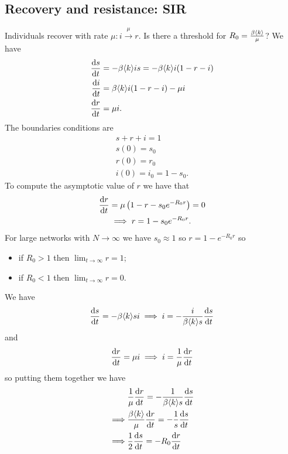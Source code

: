 \documentclass[a4paper,9pt]{extarticle}
\begin{document}
\begin{multicols*}{2}
	\subsection{Recovery and resistance: SIR}
	Individuals recover with rate $\mu:i\xrightarrow{\mu}r$. Is there a threshold for $R_{0}=\frac{\beta\langle k \rangle}{\mu}$? We have
	\begin{align*}
		\frac{\mathrm{d} s}{\mathrm{d} t}&=-\beta\langle k \rangle is=-\beta\langle k \rangle i(1-r-i)\\
		\frac{\mathrm{d} i}{\mathrm{d} t}&=\beta\langle k \rangle i(1-r-i)-\mu i\\
		\frac{\mathrm{d} r}{\mathrm{d} t}&=\mu i.
	\end{align*}
	The boundaries conditions are 
	\begin{equation*}
		\begin{array}{l}
			s+r+i=1\\
			s(0)=s_{0}\\
			r(0)=r_{0}\\
			i(0)=i_{0}=1-s_{0}.
		\end{array}
	\end{equation*}
	To compute the asymptotic value of $r$ we have that
	\begin{align*}
		\frac{\mathrm{d} r}{\mathrm{d} t}&=\mu\left(1-r-s_{0}e^{-R_{0}r}\right)=0\\
		&\implies r=1-s_{0}e^{-R_{0}r}.
	\end{align*}
	For large networks with $N\to\infty$ we have $s_0\approx 1$ so $r=1-e^{-R_{0}r}$ so
	\begin{itemize}
		\item if $R_{0}>1$ then $\lim_{t\to\infty}r=1$;
		\item if $R_{0}<1$ then $\lim_{t\to\infty}r=0$.
	\end{itemize}
	We have
	\begin{equation*}
		\frac{\mathrm{d} s}{\mathrm{d} t}=-\beta\langle k \rangle si\implies i=-\frac{i}{\beta\langle k \rangle s}\frac{\mathrm{d} s}{\mathrm{d} t}
	\end{equation*}
	and
	\begin{equation*}
		\frac{\mathrm{d} r}{\mathrm{d} t}=\mu i\implies i=\frac{1}{\mu}\frac{\mathrm{d} r}{\mathrm{d} t}
	\end{equation*}
	so putting them together we have
	\begin{align*}
		&\frac{1}{\mu}\frac{\dif r}{\dt}=-\frac{1}{\beta\ang{k}s}\frac{\dif s}{\dt}\\
		\implies&\frac{\beta\ang{k}}{\mu}\frac{\dif r}{\dt}=-\frac{1}{s}\frac{\dif s}{\dt}\\
		\implies&\frac{1}{2}\frac{\dif s}{\dt}=-R_{0}\frac{\dif r}{\dt}\\

\end{align*}
\end{multicols*}
\end{document}
